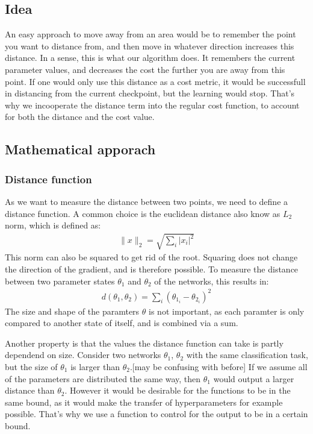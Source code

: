 \begin{comment}
motivations:
- different values for ensemble method
- seen that cells exists, escape these cells
- explore instead of exploit

\end{comment}
\subsection{Idea}
An easy approach to move away from an area would be to remember the point you
want to distance from, and then move in whatever direction increases this
distance. In a sense, this is what our algorithm does. It remembers the current
parameter values, and decreases the cost the further you are away from this
point. If one would only use this distance as a cost metric, it would be
successfull in distancing from the current checkpoint, but the learning would
stop. That's why we incooperate the distance term into the regular cost
function, to account for both the distance and the cost value.
\subsection{Mathematical apporach}
\subsubsection{Distance function}\label{distance_function}
As we want to measure the distance between two points, we need to define a
distance function. A common choice is the euclidean distance also know as $L_2$
norm, which is defined as: 
\begin{align}
    \rVert x \lVert_2 = \sqrt{\sum_i \lvert x_i \rvert^2}
\end{align}
This norm can also be squared to get rid of the root. Squaring does not change
the direction of the gradient, and is therefore possible. To measure the
distance between two parameter states $\theta_1$ and $\theta_2$ of the networks,
this results in:
\begin{align}\label{eq:distance}
    d(\theta_1, \theta_2)= \sum_i (\theta_{1_i}-\theta_{2_i})^2
\end{align}
The size and shape of the paramters $\theta$ is not important, as each paramter
is only compared to another state of itself, and is combined via a sum.

Another property is that the values the distance function can take is partly
dependend on size. Consider two networks $\theta_1$, $\theta_2$ with the same
classification task, but the size of $\theta_1$ is larger than $\theta_2$.[may
be confusing with before] If we assume all of the parameters are distributed the
same way, then $\theta_1$ would output a larger distance than $\theta_2$.
However it would be desirable for the functions to be in the same bound, as it
would make the transfer of hyperparameters for example possible. That's why we
use a function to control for the output to be in a certain bound.


